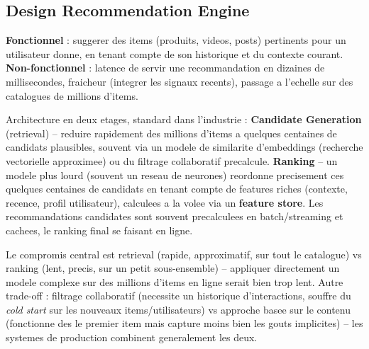 \documentclass[11pt,a4paper]{article}
\newenvironment{sujet}[1]{%
  \subsection{#1}
}{%
  \bigskip
}
\begin{document}
\begin{sujet}{Design Recommendation Engine}

\begin{req}
\textbf{Fonctionnel} : suggerer des items (produits, videos, posts) pertinents pour un utilisateur donne, en tenant compte de son historique et du contexte courant. \textbf{Non-fonctionnel} : latence de servir une recommandation en dizaines de millisecondes, fraicheur (integrer les signaux recents), passage a l'echelle sur des catalogues de millions d'items.
\end{req}

\begin{archbox}
Architecture en deux etages, standard dans l'industrie : \textbf{Candidate Generation} (retrieval) -- reduire rapidement des millions d'items a quelques centaines de candidats plausibles, souvent via un modele de similarite d'embeddings (recherche vectorielle approximee) ou du filtrage collaboratif precalcule. \textbf{Ranking} -- un modele plus lourd (souvent un reseau de neurones) reordonne precisement ces quelques centaines de candidats en tenant compte de features riches (contexte, recence, profil utilisateur), calculees a la volee via un \textbf{feature store}. Les recommandations candidates sont souvent precalculees en batch/streaming et cachees, le ranking final se faisant en ligne.
\end{archbox}

\begin{tradeoff}
Le compromis central est retrieval (rapide, approximatif, sur tout le catalogue) vs ranking (lent, precis, sur un petit sous-ensemble) -- appliquer directement un modele complexe sur des millions d'items en ligne serait bien trop lent. Autre trade-off : filtrage collaboratif (necessite un historique d'interactions, souffre du \emph{cold start} sur les nouveaux items/utilisateurs) vs approche basee sur le contenu (fonctionne des le premier item mais capture moins bien les gouts implicites) -- les systemes de production combinent generalement les deux.
\end{tradeoff}

\end{sujet}
\end{document}
